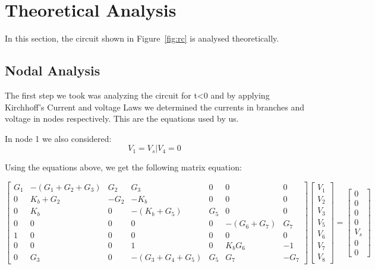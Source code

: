 \section{Theoretical Analysis}
\label{sec:analysis}

In this section, the circuit shown in Figure~\ref{fig:rc} is analysed
theoretically.

\subsection{Nodal Analysis}

The first step we took was analyzing the circuit for t<0 and by applying Kirchhoff's Current and voltage Laws we determined the currents in branches and voltage in nodes respectively. This are the equations used by us.

In node 1 we also considered:
\begin{equation}
	V_1 = V_s | V_4 = 0
\end{equation}


Using the equations above, we get the following matrix equation:

\begin{equation*}
	\begin{bmatrix}
		G_1 & -(G_1 + G_2 + G_3) & G_2 & G_3 & 0 & 0 & 0 \\ 
		0 & K_b + G_2 & -G_2 & -K_b & 0 & 0 & 0 \\
		0 & K_b & 0 & -(K_b + G_5) & G_5 & 0 & 0 \\ 
		0 & 0 & 0 & 0 & 0 & -(G_6 + G_7) & G_7 \\
		1 & 0 & 0 & 0 & 0 & 0 & 0 \\
		0 & 0 & 0 & 1 & 0 & K_bG_6 & -1 \\
		0 & G_3 & 0 & -(G_3 + G_4 + G_5) & G_5 & G_7 & -G_7
	\end{bmatrix}
	\begin{bmatrix} V_1 \\ V_2 \\ V_3 \\ V_5 \\ V_6 \\ V_7 \\ V_8 \end{bmatrix}
	=
	\begin{bmatrix} 0 \\ 0 \\ 0 \\ 0 \\ V_s \\ 0 \\ 0 \end{bmatrix}
\end{equation*}

